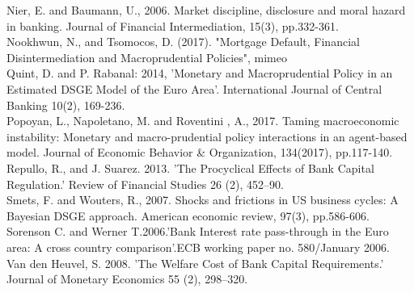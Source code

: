 \documentclass[12pt]{article}
\numberwithin{equation}{section}
\begin{document}
Nier, E. and Baumann, U., 2006. Market discipline, disclosure and moral hazard in banking. Journal of Financial Intermediation, 15(3), pp.332-361. \\

Nookhwun, N., and Tsomocos, D. (2017). "Mortgage Default, Financial Disintermediation and
Macroprudential Policies", mimeo
\\


Quint, D. and P. Rabanal: 2014, 'Monetary and Macroprudential Policy in an Estimated
DSGE Model of the Euro Area'. International Journal of Central Banking
10(2), 169-236.\\

Popoyan, L., Napoletano, M. and Roventini , A., 2017. Taming macroeconomic instability: Monetary and
macro-prudential policy interactions in an agent-based
model. Journal of Economic Behavior \& Organization, 134(2017), pp.117-140. \\

Repullo, R., and J. Suarez. 2013. 'The Procyclical Effects of Bank
Capital Regulation.' Review of Financial Studies 26 (2), 452–90.\\

Smets, F. and Wouters, R., 2007. Shocks and frictions in US business cycles: A Bayesian DSGE approach. American economic review, 97(3), pp.586-606. \\

Sorenson C. and Werner T.2006.'Bank Interest rate pass-through in the Euro area: A cross country comparison'.ECB working paper no. 580/January 2006.\\

Van den Heuvel, S. 2008. 'The Welfare Cost of Bank Capital
Requirements.' Journal of Monetary Economics 55 (2), 298–320.\\














\newpage
\end{document}

